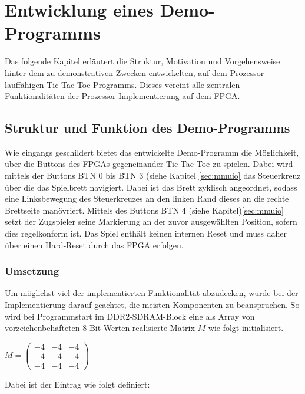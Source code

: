 \chapter{Entwicklung eines Demo-Programms}

Das folgende Kapitel erläutert die Struktur, Motivation und Vorgehensweise hinter dem zu demonstrativen Zwecken entwickelten, auf dem Prozessor lauffähigen Tic-Tac-Toe Programms. Dieses vereint alle zentralen Funktionalitäten der Prozessor-Implementierung auf dem FPGA.

\section{Struktur und Funktion des Demo-Programms}

Wie eingangs geschildert bietet das entwickelte Demo-Programm die Möglichkeit, über die Buttons des FPGAs gegeneinander Tic-Tac-Toe zu spielen. Dabei wird mittels der Buttons BTN 0 bis BTN 3 (siehe Kapitel \ref{sec:mmuio} das Steuerkreuz über die das Spielbrett navigiert. Dabei ist das Brett zyklisch angeordnet, sodass eine Linksbewegung des Steuerkreuzes an den linken Rand dieses an die rechte Brettseite manövriert. Mittels des Buttons BTN 4 (siehe Kapitel)\ref{sec:mmuio} setzt der Zugspieler seine Markierung an der zuvor ausgewählten Position, sofern dies regelkonform ist. Das Spiel enthält keinen internen Reset und muss daher über einen Hard-Reset durch das FPGA erfolgen. 

\subsection{Umsetzung}

Um möglichst viel der implementierten Funktionalität abzudecken, wurde bei der Implementierung darauf geachtet, die meisten Komponenten zu beanspruchen. So wird bei Programmstart im DDR2-SDRAM-Block eine als Array von vorzeichenbehafteten 8-Bit Werten realisierte Matrix $M$ wie folgt initialisiert.

$ M = \begin{pmatrix} -4 & -4 & -4\\ -4 & -4 & -4\\ -4 & -4 & -4  \end{pmatrix} $

Dabei ist der Eintrag wie folgt definiert:

